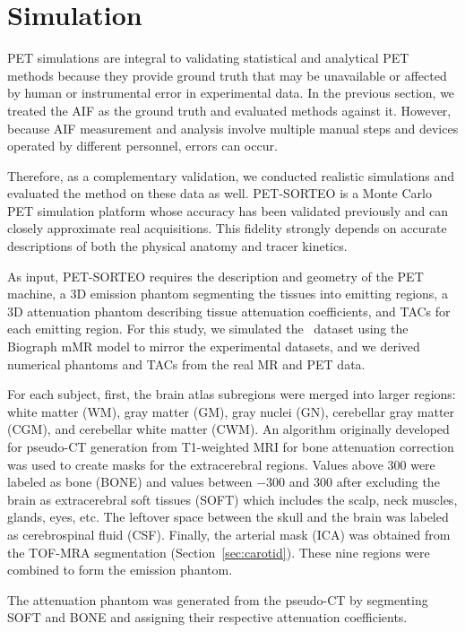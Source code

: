 \section{Simulation}
PET simulations are integral to validating statistical and analytical PET methods because they provide ground truth that may be unavailable or affected by human or instrumental error in experimental data.
In the previous section, we treated the AIF as the ground truth and evaluated methods against it.
However, because AIF measurement and analysis involve multiple manual steps and devices operated by different personnel, errors can occur.

Therefore, as a complementary validation, we conducted realistic simulations and evaluated the method on these data as well.
PET-SORTEO is a Monte Carlo PET simulation platform \cite{reilhac2004pet,reilhac2016validation} whose accuracy has been validated previously \cite{reilhac2005pet} and can closely approximate real acquisitions.
This fidelity strongly depends on accurate descriptions of both the physical anatomy and tracer kinetics.

As input, PET-SORTEO requires the description and geometry of the PET machine, a 3D emission phantom segmenting the tissues into emitting regions, a 3D attenuation phantom describing tissue attenuation coefficients, and TACs for each emitting region.
For this study, we simulated the \fdg\ dataset using the Biograph mMR model to mirror the experimental datasets, and we derived numerical phantoms and TACs from the real MR and PET data.

For each subject, first, the brain atlas subregions were merged into larger regions: white matter (WM), gray matter (GM), gray nuclei (GN), cerebellar gray matter (CGM), and cerebellar white matter (CWM).
An algorithm originally developed for pseudo-CT generation from T1-weighted MRI for bone attenuation correction was used to create masks for the extracerebral regions\cite{mérid2017}.
Values above 300 were labeled as bone (BONE) and values between \(-300\) and \(300\) after excluding the brain as extracerebral soft tissues (SOFT) which includes the scalp, neck muscles, glands, eyes, etc.
The leftover space between the skull and the brain was labeled as cerebrospinal fluid (CSF).
Finally, the arterial mask (ICA) was obtained from the TOF-MRA segmentation (Section~\ref{sec:carotid}).
These nine regions were combined to form the emission phantom.

The attenuation phantom was generated from the pseudo-CT by segmenting SOFT and BONE and assigning their respective attenuation coefficients.

